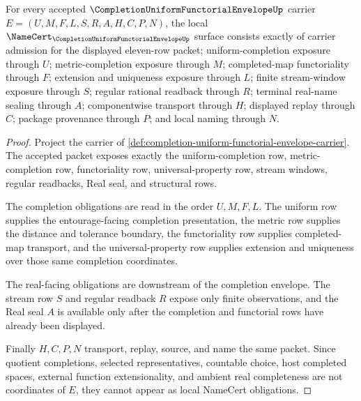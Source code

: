 \begin{theorem}
\label{thm:completion-uniform-functorial-envelope-namecert-obligations}
For every accepted $\CompletionUniformFunctorialEnvelopeUp$ carrier $E=(U,M,F,L,S,R,A,H,C,P,N)$, the local $\NameCert_{\CompletionUniformFunctorialEnvelopeUp}$ surface consists exactly of carrier admission for the displayed eleven-row packet; uniform-completion exposure through $U$; metric-completion exposure through $M$; completed-map functoriality through $F$; extension and uniqueness exposure through $L$; finite stream-window exposure through $S$; regular rational readback through $R$; terminal real-name sealing through $A$; componentwise transport through $H$; displayed replay through $C$; package provenance through $P$; and local naming through $N$.
\end{theorem}
\begin{proof}
Project the carrier of \autoref{def:completion-uniform-functorial-envelope-carrier}. The accepted packet exposes exactly the uniform-completion row, metric-completion row, functoriality row, universal-property row, stream windows, regular readbacks, Real seal, and structural rows.

The completion obligations are read in the order $U,M,F,L$. The uniform row supplies the entourage-facing completion presentation, the metric row supplies the distance and tolerance boundary, the functoriality row supplies completed-map transport, and the universal-property row supplies extension and uniqueness over those same completion coordinates.

The real-facing obligations are downstream of the completion envelope. The stream row $S$ and regular readback $R$ expose only finite observations, and the Real seal $A$ is available only after the completion and functorial rows have already been displayed.

Finally $H,C,P,N$ transport, replay, source, and name the same packet. Since quotient completions, selected representatives, countable choice, host completed spaces, external function extensionality, and ambient real completeness are not coordinates of $E$, they cannot appear as local NameCert obligations.
\end{proof}

